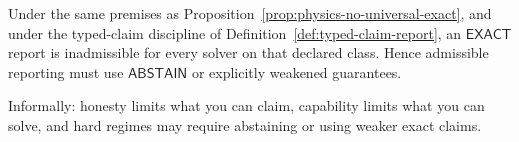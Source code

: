 \begin{corollary}\label{cor:physics-no-universal-exact-claim}
Under the same premises as Proposition~\ref{prop:physics-no-universal-exact}, and under the typed-claim discipline of Definition~\ref{def:typed-claim-report}, an $\mathsf{EXACT}$ report is inadmissible for every solver on that declared class.
Hence admissible reporting must use $\mathsf{ABSTAIN}$ or explicitly weakened guarantees.
\end{corollary}

Informally: honesty limits what you can claim, capability limits what you can solve, and hard regimes may require abstaining or using weaker exact claims.



